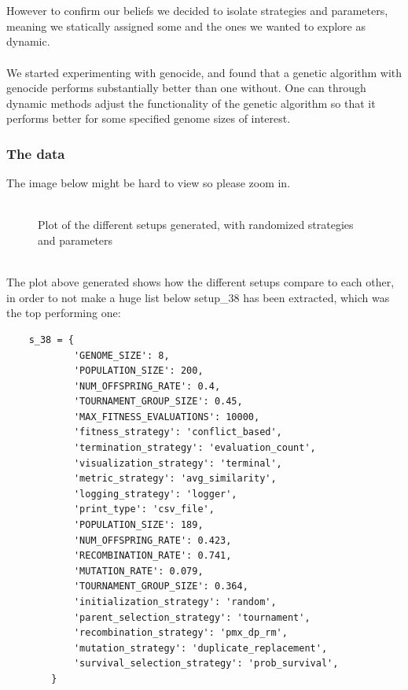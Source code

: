 \\\\
However to confirm our beliefs we decided to isolate strategies and parameters, meaning we statically assigned some and the ones we wanted to explore as dynamic.
\\\\
We started experimenting with genocide, and found that a genetic algorithm with genocide performs substantially better than one without. One can through dynamic methods adjust the functionality of the genetic algorithm so that it performs better for some specified genome sizes of interest.
\subsubsection{The data}

The image below might be hard to view so please zoom in.
\\~\\
\begin{figure}[ht]
\centering
{}
    \caption{Plot of the different setups generated, with randomized strategies and parameters}
\end{figure}
\\
The plot above generated shows how the different setups compare to each other, in order to not make a huge list below setup\_38 has been extracted, which was the top performing one:
\\
\begin{verbatim}
    s_38 = {
            'GENOME_SIZE': 8,
            'POPULATION_SIZE': 200,
            'NUM_OFFSPRING_RATE': 0.4,
            'TOURNAMENT_GROUP_SIZE': 0.45,
            'MAX_FITNESS_EVALUATIONS': 10000,
            'fitness_strategy': 'conflict_based',
            'termination_strategy': 'evaluation_count',
            'visualization_strategy': 'terminal',
            'metric_strategy': 'avg_similarity',
            'logging_strategy': 'logger',
            'print_type': 'csv_file',
            'POPULATION_SIZE': 189,
            'NUM_OFFSPRING_RATE': 0.423,
            'RECOMBINATION_RATE': 0.741,
            'MUTATION_RATE': 0.079,
            'TOURNAMENT_GROUP_SIZE': 0.364,
            'initialization_strategy': 'random',
            'parent_selection_strategy': 'tournament',
            'recombination_strategy': 'pmx_dp_rm',
            'mutation_strategy': 'duplicate_replacement',
            'survival_selection_strategy': 'prob_survival',
        }
\end{verbatim}
